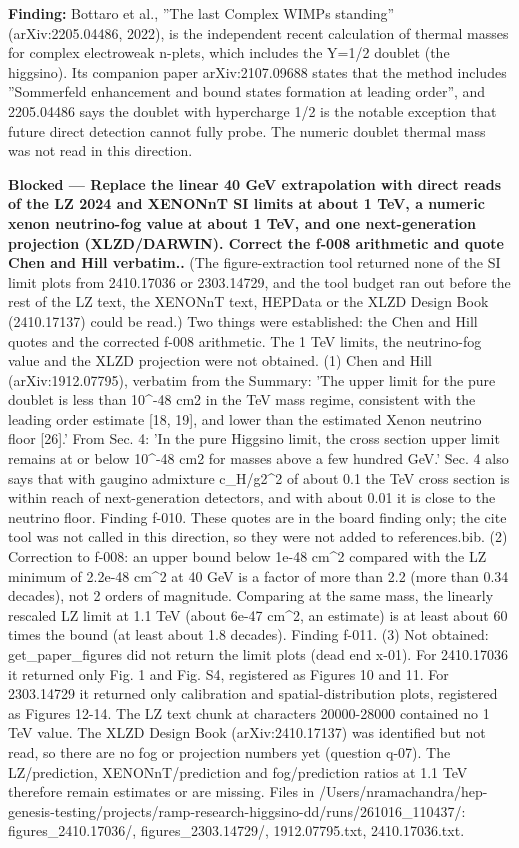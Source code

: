 \documentclass[11pt,a4paper]{article}
\begin{document}
\textbf{Finding:} Bottaro et al., ''The last Complex WIMPs standing'' (arXiv:2205.04486, 2022), is the independent recent calculation of thermal masses for complex electroweak n-plets, which includes the Y=1/2 doublet (the higgsino). Its companion paper arXiv:2107.09688 states that the method includes ''Sommerfeld enhancement and bound states formation at leading order'', and 2205.04486 says the doublet with hypercharge 1/2 is the notable exception that future direct detection cannot fully probe. The numeric doublet thermal mass was not read in this direction.

\textbf{Blocked --- Replace the linear 40 GeV extrapolation with direct reads of the LZ 2024 and XENONnT SI limits at about 1 TeV, a numeric xenon neutrino-fog value at about 1 TeV, and one next-generation projection (XLZD/DARWIN). Correct the f-008 arithmetic and quote Chen and Hill verbatim..} (The figure-extraction tool returned none of the SI limit plots from 2410.17036 or 2303.14729, and the tool budget ran out before the rest of the LZ text, the XENONnT text, HEPData or the XLZD Design Book (2410.17137) could be read.) Two things were established: the Chen and Hill quotes and the corrected f-008 arithmetic. The 1 TeV limits, the neutrino-fog value and the XLZD projection were not obtained. (1) Chen and Hill (arXiv:1912.07795), verbatim from the Summary: 'The upper limit for the pure doublet is less than 10\textasciicircum{}-48 cm2 in the TeV mass regime, consistent with the leading order estimate [18, 19], and lower than the estimated Xenon neutrino floor [26].' From Sec. 4: 'In the pure Higgsino limit, the cross section upper limit remains at or below 10\textasciicircum{}-48 cm2 for masses above a few hundred GeV.' Sec. 4 also says that with gaugino admixture c\_H/g2\textasciicircum{}2 of about 0.1 the TeV cross section is within reach of next-generation detectors, and with about 0.01 it is close to the neutrino floor. Finding f-010. These quotes are in the board finding only; the cite tool was not called in this direction, so they were not added to references.bib. (2) Correction to f-008: an upper bound below 1e-48 cm\textasciicircum{}2 compared with the LZ minimum of 2.2e-48 cm\textasciicircum{}2 at 40 GeV is a factor of more than 2.2 (more than 0.34 decades), not 2 orders of magnitude. Comparing at the same mass, the linearly rescaled LZ limit at 1.1 TeV (about 6e-47 cm\textasciicircum{}2, an estimate) is at least about 60 times the bound (at least about 1.8 decades). Finding f-011. (3) Not obtained: get\_paper\_figures did not return the limit plots (dead end x-01). For 2410.17036 it returned only Fig. 1 and Fig. S4, registered as Figures 10 and 11. For 2303.14729 it returned only calibration and spatial-distribution plots, registered as Figures 12-14. The LZ text chunk at characters 20000-28000 contained no 1 TeV value. The XLZD Design Book (arXiv:2410.17137) was identified but not read, so there are no fog or projection numbers yet (question q-07). The LZ/prediction, XENONnT/prediction and fog/prediction ratios at 1.1 TeV therefore remain estimates or are missing. Files in /Users/nramachandra/hep-genesis-testing/projects/ramp-research-higgsino-dd/runs/261016\_110437/: figures\_2410.17036/, figures\_2303.14729/, 1912.07795.txt, 2410.17036.txt.
\end{document}

